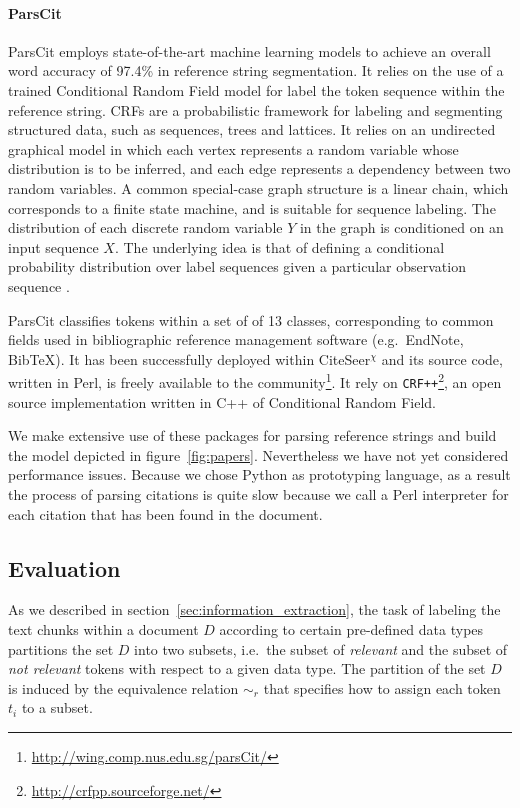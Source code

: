 \paragraph{ParsCit} ParsCit \cite{councill:pos} employs state-of-the-art machine learning models to achieve an overall word accuracy of 97.4\% in reference string segmentation. It relies on the use of a trained Conditional Random Field model for label the token sequence within the reference string. CRFs are a probabilistic framework for labeling and segmenting structured data, such as sequences, trees and lattices. It relies on an undirected graphical model in which each vertex represents a random variable whose distribution is to be inferred, and each edge represents a dependency between two random variables. A common special-case graph structure is a linear chain, which corresponds to a finite state machine, and is suitable for sequence labeling. The distribution of each discrete random variable $Y$ in the graph is conditioned on an input sequence $X$. The underlying idea is that of defining a conditional probability distribution over label sequences given a particular observation sequence \cite{lafferty2001crf}.

ParsCit classifies tokens within a set of of 13 classes, corresponding to common fields used in bibliographic reference management software (e.g.\ EndNote, BibTeX). It has been successfully deployed within CiteSeer$^\chi$ \cite{li2006} and its source code, written in Perl, is freely available to the community\footnote{\url{http://wing.comp.nus.edu.sg/parsCit/}}. It rely on \texttt{CRF++}\footnote{\url{http://crfpp.sourceforge.net/}}, an open source implementation written in C++ of Conditional Random Field.

We make extensive use of these packages for parsing reference strings and build the model depicted in figure~\ref{fig:papers}. Nevertheless we have not yet considered performance issues. Because we chose Python as prototyping language, as a result the process of parsing citations is quite slow because we call a Perl interpreter for each citation that has been found in the document.

\subsection{Evaluation}\label{sec:ie_evaluation}
As we described in section~\ref{sec:information_extraction}, the task of labeling the text chunks within a document $D$ according to certain pre-defined data types partitions the set $D$ into two subsets, i.e.\ the subset of \emph{relevant} and the subset of \emph{not relevant} tokens with respect to a given data type. The partition of the set $D$ is induced by the equivalence relation $\sim_r$ that specifies how to assign each token $t_i$ to a subset. 

